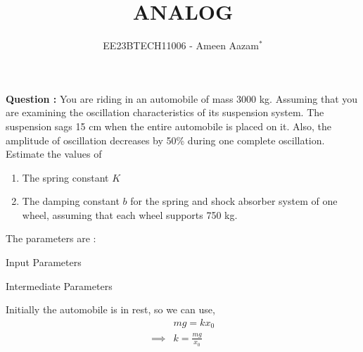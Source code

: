 \documentclass[journal,12pt,twocolumn]{IEEEtran}
\theoremstyle{remark}
\begin{document}

\vspace{3cm}

\title{ANALOG}
\author{EE23BTECH11006 - Ameen Aazam$^{*}$%
}
\maketitle
\newpage
\bigskip

\renewcommand{\thefigure}{\theenumi}
\renewcommand{\thetable}{\theenumi}

\vspace{3cm}
\textbf{Question :}
You are riding in an automobile of mass 3000 kg. Assuming that you are examining the oscillation characteristics of its suspension system. The suspension sags 15 cm when the entire automobile is placed on it. Also, the amplitude of oscillation decreases by 50\% during one complete oscillation. Estimate the values of
\begin{enumerate}[label=(\alph*)]
    \item The spring constant \( K \)
    \item The damping constant \( b \) for the spring and shock absorber system of one wheel, assuming that each wheel supports 750 kg.
\end{enumerate}
\solution
\fi
The parameters are :
    \begin{table}[htbp]
        \centering
        
        \vspace{5pt}
        \caption{Input Parameters}
    \end{table}
    \begin{table}[htbp]
        \centering
	
        \vspace{5pt}
        \caption{Intermediate Parameters}
    \end{table}
    
    \vspace{15pt}
    


    Initially the automobile is in rest, so we can use,
    \begin{align}
        &mg = kx_0 \\
        \implies &k=\frac{mg}{x_0} 
    \end{align}
\end{document}
